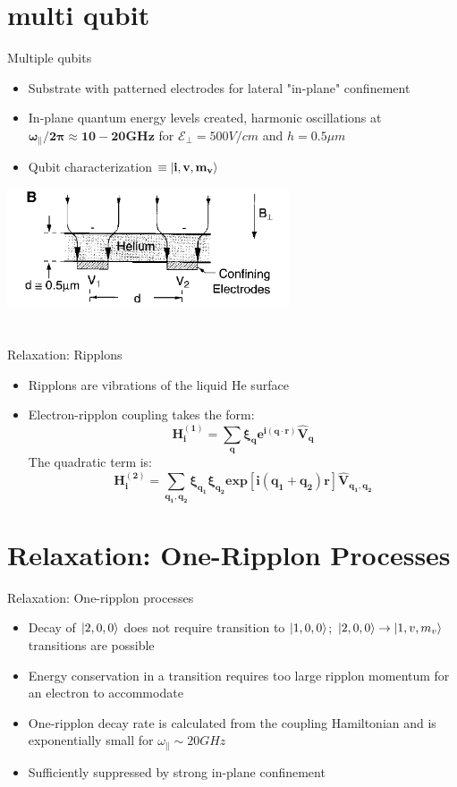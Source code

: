 \documentclass{beamer}
\begin{document}
\section{multi qubit}
\begin{frame}[t]{Multiple qubits}
    \begin{itemize}
        \item Substrate with patterned electrodes for lateral "in-plane" confinement
        \item In-plane quantum energy levels created, harmonic oscillations at $\mathbf{\omega_{\parallel}/2\pi \approx 10-20 GHz}$ for $\mathcal{E}_{\perp}= 500 V/cm$ and $h=0.5\mu m$
        \item Qubit characterization $\mathbf{\equiv \ket{i, v, m_v}}$
    \end{itemize}
    \centering\includegraphics[height=3.5cm]{images/multi qubit.png}
\end{frame}

\section{}
\begin{frame}[t]{Relaxation: Ripplons}
    \begin{itemize}
        \item Ripplons are vibrations of the liquid He surface 
        \item Electron-ripplon coupling takes the form: $$\mathbf{H_{i}^{(1)} = \sum\limits_{q}\xi_{q}e^{i(q \cdot r)}\hat{V}_q}$$
        The quadratic term is: $$\mathbf{H^{(2)}_i = \sum\limits_{q_1,q_2}\xi_{q_1}\xi_{q_2}exp[i(q_1+q_2)r]\hat{V}_{q_1,q_2}}$$
    \end{itemize}
\end{frame}

\section{Relaxation: One-Ripplon Processes}
\begin{frame}[t]{Relaxation: One-ripplon processes}
    \begin{itemize}
        \item Decay of $\ket{2,0,0}$ does not require transition to $\ket{1,0,0}$;  $\ket{2,0,0}\rightarrow\ket{1,v,m_v}$ transitions are possible        
        \item Energy conservation in a transition requires too large ripplon momentum for an electron to accommodate
        \item One-ripplon decay rate is calculated from the coupling Hamiltonian and is exponentially small for $\omega_{\parallel}\sim 20 GHz$
        \item Sufficiently suppressed by strong in-plane confinement
    \end{itemize}
\end{frame}
\end{document}
